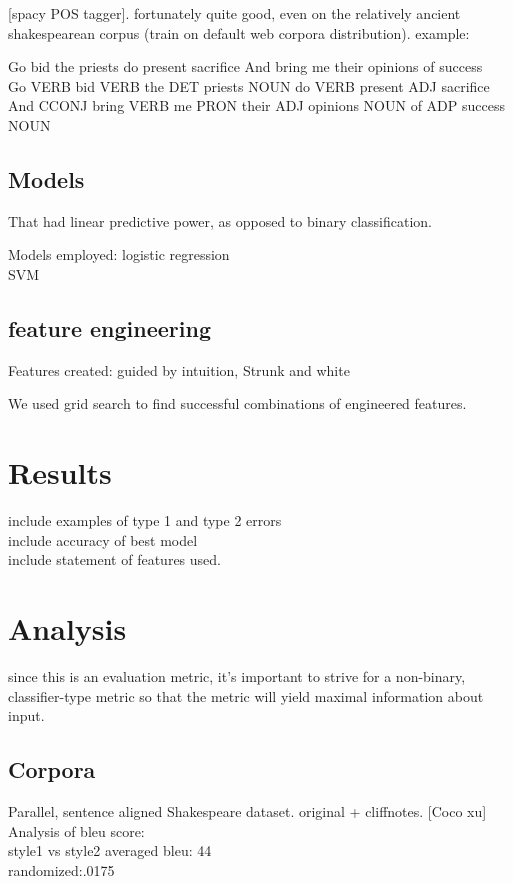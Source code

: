 \documentclass[letterpaper, 10 pt, conference]{ieeeconf}  %
\begin{document}
[spacy POS tagger]. fortunately quite good, even on the relatively ancient shakespearean corpus (train on default web corpora distribution). example:

Go bid the priests do present sacrifice And bring me their opinions of success\\

Go VERB    
bid VERB   
the DET   
priests NOUN 
do  VERB   
present ADJ  
sacrifice
And CCONJ 
bring VERB  
me  PRON   
their ADJ    
opinions  NOUN  
of  ADP    
success NOUN 


\subsection{Models}
That had linear predictive power, as opposed to binary classification. 

Models employed:
logistic regression\\
SVM




\subsection{feature engineering}
Features created:
guided by intuition, Strunk and white

We used grid search to find successful combinations of engineered features.
  
\section{Results}
  include examples of type 1 and type 2 errors\\
  include accuracy of best model\\
  include statement of features used.\\
\section{Analysis}
  since this is an evaluation metric, it's important to strive for a non-binary, classifier-type metric so that the metric will yield maximal information about input.
  \subsection{Corpora}
    Parallel, sentence aligned Shakespeare dataset. original + cliffnotes. [Coco xu]
    Analysis of bleu score:\\

    style1 vs style2 averaged bleu: 44 \\
randomized:.0175 \\
\end{document}
